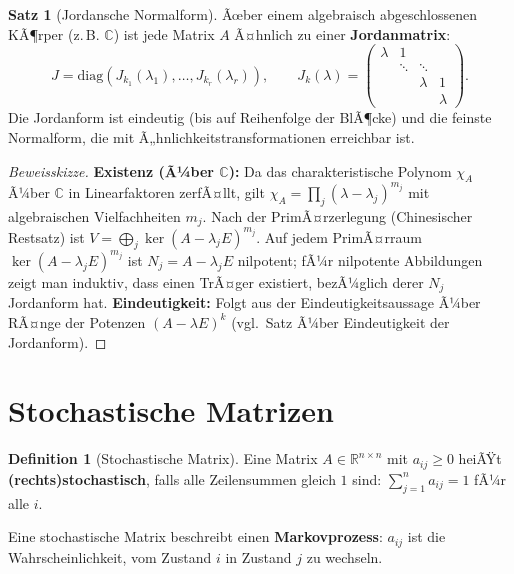 ﻿\documentclass[a4paper,12pt]{report}
\theoremstyle{definition}
\newtheorem{definition}{Definition}
\newtheorem{satz}{Satz}
\begin{document}
\begin{satz}[Jordansche Normalform]
    Ãœber einem algebraisch abgeschlossenen KÃ¶rper (z.\,B. $\mathbb{C}$) ist
    jede Matrix $A$ Ã¤hnlich zu einer \textbf{Jordanmatrix}:
    \[
        J = \mathrm{diag}(J_{k_1}(\lambda_1), \dots, J_{k_r}(\lambda_r)), \qquad
        J_k(\lambda) = \begin{pmatrix} \lambda & 1 & & \\ & \ddots & \ddots & \\
        & & \lambda & 1 \\ & & & \lambda \end{pmatrix}.
    \]
    Die Jordanform ist eindeutig (bis auf Reihenfolge der BlÃ¶cke) und die
    feinste Normalform, die mit Ã„hnlichkeitstransformationen erreichbar ist.
\end{satz}
\begin{proof}[Beweisskizze]
    \textbf{Existenz (Ã¼ber $\mathbb{C}$):} Da das charakteristische Polynom
    $\chi_A$ Ã¼ber $\mathbb{C}$ in Linearfaktoren zerfÃ¤llt, gilt
    $\chi_A = \prod_j (\lambda - \lambda_j)^{m_j}$ mit algebraischen
    Vielfachheiten $m_j$. Nach der PrimÃ¤rzerlegung (Chinesischer Restsatz)
    ist $V = \bigoplus_j \ker(A - \lambda_j E)^{m_j}$.
    Auf jedem PrimÃ¤rraum $\ker(A - \lambda_j E)^{m_j}$ ist $N_j = A - \lambda_j E$
    nilpotent; fÃ¼r nilpotente Abbildungen zeigt man induktiv, dass
    einen TrÃ¤ger existiert, bezÃ¼glich derer $N_j$ Jordanform hat.
    \textbf{Eindeutigkeit:} Folgt aus der Eindeutigkeitsaussage Ã¼ber RÃ¤nge
    der Potenzen $(A - \lambda E)^k$ (vgl.\ Satz Ã¼ber Eindeutigkeit der Jordanform).
\end{proof}


\section{Stochastische Matrizen}

\begin{definition}[Stochastische Matrix]
    Eine Matrix $A \in \mathbb{R}^{n \times n}$ mit $a_{ij} \ge 0$ heiÃŸt
    \textbf{(rechts)stochastisch}, falls alle Zeilensummen gleich $1$ sind:
    $\sum_{j=1}^n a_{ij} = 1$ fÃ¼r alle $i$.

    Eine stochastische Matrix beschreibt einen \textbf{Markovprozess}:
    $a_{ij}$ ist die Wahrscheinlichkeit, vom Zustand $i$ in Zustand $j$
    zu wechseln.
\end{definition}
\end{document}
